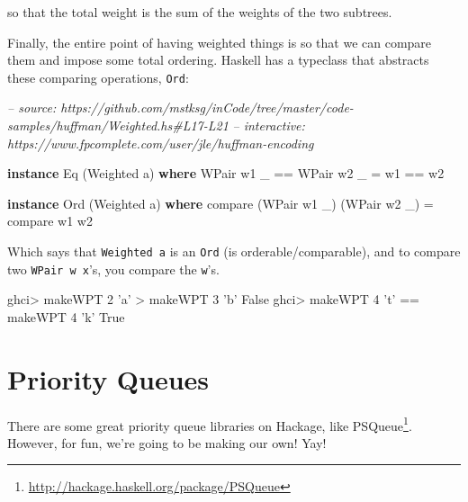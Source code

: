\documentclass[]{article}
\newenvironment{Shaded}{}{}
\newcommand{\CharTok}[1]{\textcolor[rgb]{0.25,0.44,0.63}{#1}}
\newcommand{\CommentTok}[1]{\textcolor[rgb]{0.38,0.63,0.69}{\textit{#1}}}
\newcommand{\DataTypeTok}[1]{\textcolor[rgb]{0.56,0.13,0.00}{#1}}
\newcommand{\DecValTok}[1]{\textcolor[rgb]{0.25,0.63,0.44}{#1}}
\newcommand{\FunctionTok}[1]{\textcolor[rgb]{0.02,0.16,0.49}{#1}}
\newcommand{\KeywordTok}[1]{\textcolor[rgb]{0.00,0.44,0.13}{\textbf{#1}}}
\newcommand{\NormalTok}[1]{#1}
\renewcommand{\href}[2]{#2\footnote{\url{#1}}}
\begin{document}
so that the total weight is the sum of the weights of the two subtrees.

Finally, the entire point of having weighted things is so that we can compare
them and impose some total ordering. Haskell has a typeclass that abstracts
these comparing operations, \texttt{Ord}:

\begin{Shaded}
\begin{Highlighting}[]
\CommentTok{-- source: https://github.com/mstksg/inCode/tree/master/code-samples/huffman/Weighted.hs#L17-L21}
\CommentTok{-- interactive: https://www.fpcomplete.com/user/jle/huffman-encoding}

\KeywordTok{instance} \DataTypeTok{Eq}\NormalTok{ (}\DataTypeTok{Weighted}\NormalTok{ a) }\KeywordTok{where}
    \DataTypeTok{WPair}\NormalTok{ w1 _ }\FunctionTok{==} \DataTypeTok{WPair}\NormalTok{ w2 _ }\FunctionTok{=}\NormalTok{ w1 }\FunctionTok{==}\NormalTok{ w2}

\KeywordTok{instance} \DataTypeTok{Ord}\NormalTok{ (}\DataTypeTok{Weighted}\NormalTok{ a) }\KeywordTok{where}
\NormalTok{    compare (}\DataTypeTok{WPair}\NormalTok{ w1 _) (}\DataTypeTok{WPair}\NormalTok{ w2 _) }\FunctionTok{=}\NormalTok{ compare w1 w2}
\end{Highlighting}
\end{Shaded}

Which says that \texttt{Weighted\ a} is an \texttt{Ord} (is
orderable/comparable), and to compare two \texttt{WPair\ w\ x}'s, you compare
the \texttt{w}'s.

\begin{Shaded}
\begin{Highlighting}[]
\NormalTok{ghci}\FunctionTok{>}\NormalTok{ makeWPT }\DecValTok{2} \CharTok{'a'} \FunctionTok{>}\NormalTok{ makeWPT }\DecValTok{3} \CharTok{'b'}
\DataTypeTok{False}
\NormalTok{ghci}\FunctionTok{>}\NormalTok{ makeWPT }\DecValTok{4} \CharTok{'t'} \FunctionTok{==}\NormalTok{ makeWPT }\DecValTok{4} \CharTok{'k'}
\DataTypeTok{True}
\end{Highlighting}
\end{Shaded}

\hypertarget{priority-queues}{%
\section{Priority Queues}\label{priority-queues}}

There are some great priority queue libraries on Hackage, like
\href{http://hackage.haskell.org/package/PSQueue}{PSQueue}. However, for fun,
we're going to be making our own! Yay!
\end{document}
